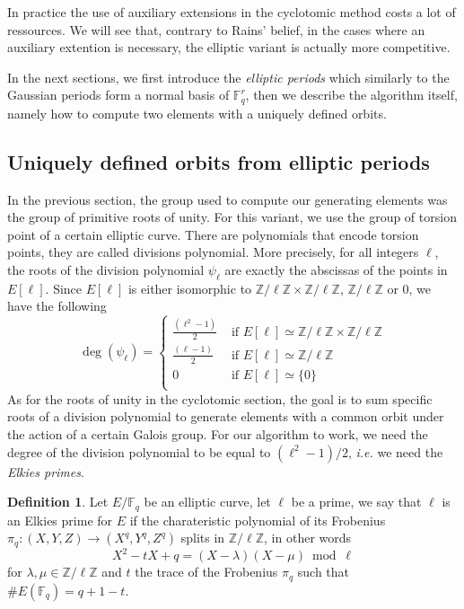\documentclass[12pt]{article}
\theoremstyle{plain}
\theoremstyle{definition}
\newtheorem{definition}[theorem]{Definition}
\def\Z{\ensuremath{\mathbb{Z}}}
\def\F{\ensuremath{\mathbb{F}}}
\newcounter{algorithm}
\begin{document}
In practice the use of auxiliary extensions in the cyclotomic method costs a
lot of ressources. We will see that, contrary to Rains' belief, in the cases 
where an auxiliary extention is necessary, the elliptic variant is actually more 
competitive.

In the next sections, we first introduce the \emph{elliptic periods} which
similarly to the Gaussian periods form a normal basis of $\F_q^r$, then we 
describe the algorithm itself, namely how to compute two elements with a
uniquely defined orbits.
 
\subsection{Uniquely defined orbits from elliptic periods}

In the previous section, the group used to compute our generating elements was
the group of primitive roots of unity. For this variant, we use the group of
torsion point of a certain elliptic curve. There are polynomials that encode 
torsion points, they are called divisions polynomial. More precisely, for
all integers $\ell$, the roots of the division polynomial $\psi_\ell$ are exactly the 
abscissas of the points in $E[\ell]$. Since $E[\ell]$ is either isomorphic to 
$\Z/\ell\Z\times\Z/\ell\Z$, $\Z/\ell\Z$ or $0$, we have the following
\begin{equation}
\deg(\psi_\ell) = \begin{cases}
   \tfrac{(\ell^2-1)}{2} &\text{ if }E[\ell]\simeq\Z/\ell\Z\times\Z/\ell\Z\\
   \tfrac{(\ell-1)}{2} &\text{ if }E[\ell]\simeq\Z/\ell\Z\\
   0 &\text{ if } E[\ell]\simeq\lbrace{0}\rbrace\\
\end{cases}
\end{equation}
As for the roots of unity in the cyclotomic section, the goal is to sum
specific roots of a division polynomial to generate elements with a common orbit
under the action of a certain Galois group. For our algorithm to work, we 
need the degree of the division polynomial to be equal to $(\ell^2 - 1)/2$,
\emph{i.e.} we need the \emph{Elkies primes}.

\begin{definition}
Let $E/\F_q$ be an elliptic curve, let $\ell$ be a prime, we say that $\ell$
is an Elkies prime for $E$ if the charateristic polynomial of its Frobenius
$\pi_q : (X, Y, Z) \to (X^q, Y^q, Z^q)$ splits in $\Z/\ell\Z$, in other words
\begin{equation}
X^2-tX+q=(X-\lambda)(X-\mu)\bmod\ell
\end{equation}
for $\lambda,\mu\in\Z/\ell\Z$ and $t$ the trace of the Frobenius $\pi_q$ such that 
$\#E(\F_q)=q+1-t$.
\end{definition}
\end{document}
